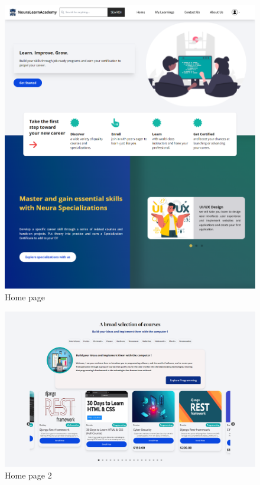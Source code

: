 \begin{figure}[h!]
	\centering
	\includegraphics[max height=\textheight,max width=\textwidth]{figures/frontend/Homepage.png}
	\caption{Home page}
\end{figure}

\begin{figure}[h!]
	\centering
	\includegraphics[max height=\textheight,max width=\textwidth]{figures/frontend/Homepage2.png}
	\caption{Home page 2}
\end{figure}

